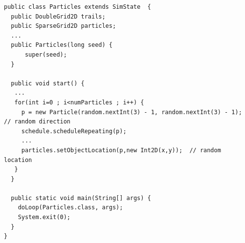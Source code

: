 \documentclass[12pt]{article}
\begin{document}
\begin{lstlisting}
public class Particles extends SimState  {
  public DoubleGrid2D trails;
  public SparseGrid2D particles;
  ...
  public Particles(long seed) {
      super(seed);
  }
  
  public void start() {
   ...
   for(int i=0 ; i<numParticles ; i++) {
     p = new Particle(random.nextInt(3) - 1, random.nextInt(3) - 1);  // random direction
     schedule.scheduleRepeating(p);
     ...
     particles.setObjectLocation(p,new Int2D(x,y));  // random location
   }
  }
  
  public static void main(String[] args) {
    doLoop(Particles.class, args);
    System.exit(0);
  }
}
\end{lstlisting}
\medskip
{}
\end{document}

